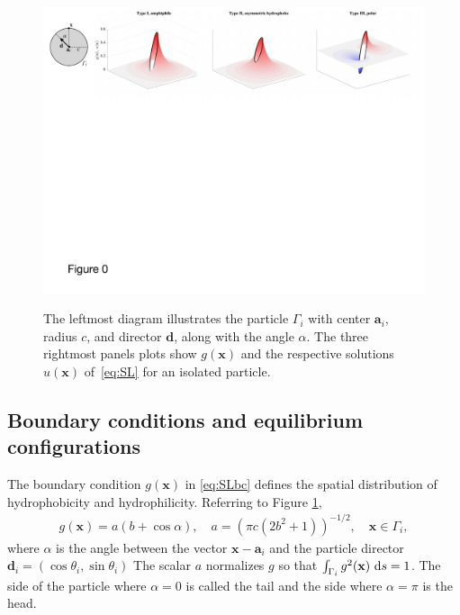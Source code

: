 \documentclass[prb,preprint,showpacs,preprintnumbers,amsmath,amssymb,longbibliography]{revtex4-1}
\renewcommand{\aa}{\mathbf{a}}
\newcommand{\dd}{\mathbf{d}}
\newcommand{\xx}{\mathbf{x}}
\begin{document}
\begin{figure}[t!]
\begin{center}
  \includegraphics[width=\textwidth]{Figures/Figure0.pdf}
\end{center}
\begin{caption}{\label{fig:boundary_conditions} The leftmost diagram
  illustrates the particle $\Gamma_i$ with center $\aa_i$, radius $c$,
  and director $\dd$, along with the angle $\alpha$.
  The three rightmost panels plots show $g(\xx)$ and
  the respective solutions $u(\xx)$ of~\eqref{eq:SL} 
  for an isolated particle.}
\end{caption}
\end{figure}
\subsection{Boundary conditions and equilibrium configurations}
The boundary condition $g(\xx)$ in
\eqref{eq:SLbc} defines the spatial distribution of
hydrophobicity and hydrophilicity.
Referring to Figure \ref{fig:boundary_conditions},
\begin{align}
  \label{eq:bc-type}
g(\xx) = a(b + \cos \alpha),\quad a = (\pi c(2b^2 + 1))^{-1/2},\quad \xx \in \Gamma_i,
\end{align}
where $\alpha$ is the angle between the vector $\xx - \aa_i$ and the
particle director $\dd_i = (\cos \theta_i, \sin \theta_i)$
The scalar $a$ normalizes $g$ so that $\int_{\Gamma_i} g^2(\xx) \, \dif s = 1$.
The side of the particle where
$\alpha = 0$ is called the tail and the side where $\alpha = \pi$ is the head. 
\end{document}
